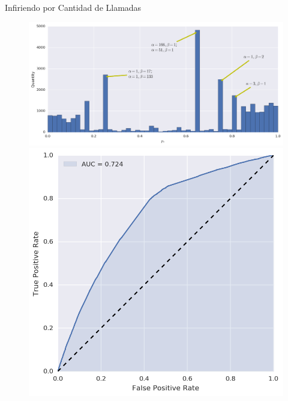 \documentclass{beamer}
\begin{document}
\begin{frame}{Infiriendo por Cantidad de Llamadas}
		\begin{figure}
			\includegraphics[width=\framewidth, height=.37\textheight, keepaspectratio]{figures/bayes/hist_calls.png} \\
			\includegraphics[width=.49\framewidth, height=.37\textheight, keepaspectratio]{figures/bayes/roc_calls.png}

\end{figure}
\end{frame}
\end{document}
